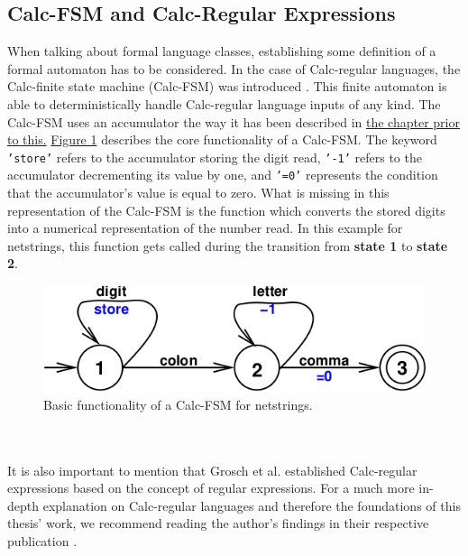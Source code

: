 \subsection{Calc-FSM and Calc-Regular Expressions}
\label{2.2}
When talking about formal language classes, establishing some definition of a formal automaton has to be considered. In the case of Calc-regular languages, the Calc-finite state machine (Calc-FSM) was introduced \cite{Calc-regular-paper}. This finite automaton is able to deterministically handle Calc-regular language inputs of any kind. The Calc-FSM uses an accumulator the way it has been described in \hyperref[2.1]{the chapter prior to this.} \hyperref[fig:Calc-FSM]{Figure 1} describes the core functionality of a Calc-FSM. The keyword \texttt{'store'} refers to the accumulator storing the digit read, \texttt{'-1'} refers to the accumulator decrementing its value by one, and \texttt{'=0'} represents the condition that the accumulator's value is equal to zero. What is missing in this representation of the Calc-FSM is the function which converts the stored digits into a numerical representation of the number read. In this example for netstrings, this function gets called during the transition from \textbf{state 1} to \textbf{state 2}.
\begin{figure}
    \centering
    \includegraphics[width=0.6\linewidth]{fig/Calc-fsm-example-2.png}
    \caption{Basic functionality of a Calc-FSM for netstrings.}
    \label{fig:Calc-FSM}
\end{figure}\\\\
It is also important to mention that Grosch et al. established Calc-regular expressions based on the concept of regular expressions. For a much more in-depth explanation on Calc-regular languages and therefore the foundations of this thesis' work, we recommend reading the author's findings in their respective publication \cite{Calc-regular-paper}.
